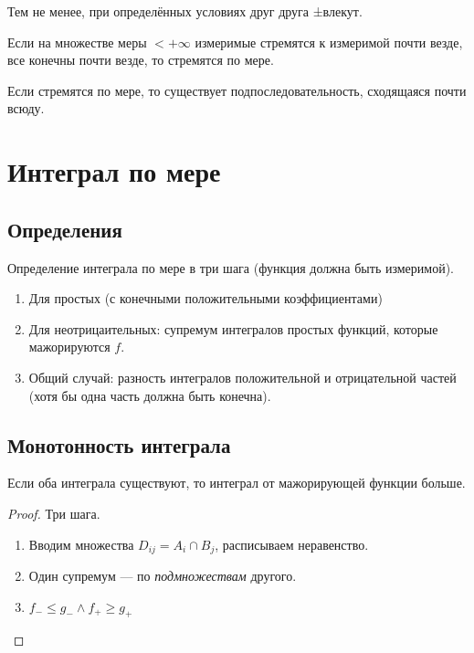 \documentclass[12pt, a4paper, oneside]{memoir}
\begin{document}
Тем не менее, при определённых условиях друг друга ±влекут.

\begin{theorem}
    [Лебега]

    Если на множестве меры $< +\infty$ измеримые стремятся к измеримой почти везде,
    все конечны почти везде, то стремятся по мере.
\end{theorem}


\begin{theorem}
    [Риса]

    Если стремятся по мере, то существует подпоследовательность, сходящаяся почти всюду.
\end{theorem}





\section{Интеграл по мере}


\subsection{Определения}

Определение интеграла по мере в три шага (функция должна быть измеримой). 

\begin{enumerate}
    \item Для простых (с конечными положительными коэффициентами)
    \item Для неотрицаительных: супремум интегралов простых функций, которые мажорируются $f$.
    \item Общий случай: разность интегралов положительной и отрицательной частей (хотя бы одна часть должна быть конечна).
\end{enumerate}


\subsection{Монотонность интеграла}

\begin{theorem}
    Если оба интеграла существуют, то интеграл от мажорирующей функции больше.

    \begin{proof}
        Три шага.

        \begin{enumerate}
            \item Вводим множества $D_{ij} = A_i \cap B_j$, расписываем неравенство.
            \item Один супремум — по \textit{подмножествам} другого.
            \item $f_{-} \leqslant g_{-} \land f_{+} \geqslant g_{+}$
        \end{enumerate}
    \end{proof}
\end{theorem}
\end{document}
